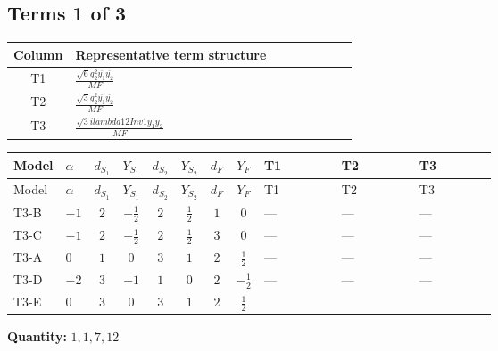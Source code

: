 \documentclass[8pt]{article}
\begin{document}
\begin{landscape}
\subsection*{Terms 1 of 3}
\begin{center}
\begin{tabular}{@{}c >{\raggedright\arraybackslash}p{0.82\linewidth}@{}}
\toprule
Column & Representative term structure \\
\midrule
T1 & \(\displaystyle \frac{\sqrt{6} g_{2}^{2} \overline{y_{1}} \overline{y_{2}}}{MF}\) \\
\midrule
T2 & \(\displaystyle \frac{\sqrt{3} g_{2}^{2} \overline{y_{1}} \overline{y_{2}}}{MF}\) \\
\midrule
T3 & \(\displaystyle \frac{\sqrt{3} i lambda12Inv1 \overline{y_{1}} \overline{y_{2}}}{MF}\) \\
\midrule
\bottomrule
\end{tabular}
\end{center}
\smallskip
\tiny
\begin{longtable}{@{}llcccccc >{\raggedright\arraybackslash}p{0.21\linewidth} >{\raggedright\arraybackslash}p{0.21\linewidth} >{\raggedright\arraybackslash}p{0.21\linewidth}@{}}
\toprule
Model & $\alpha$ & $d_{S_1}$ & $Y_{S_1}$ & $d_{S_2}$ & $Y_{S_2}$ & $d_F$ & $Y_F$ & T1 & T2 & T3 \\
\midrule
\endfirsthead
\toprule
Model & $\alpha$ & $d_{S_1}$ & $Y_{S_1}$ & $d_{S_2}$ & $Y_{S_2}$ & $d_F$ & $Y_F$ & T1 & T2 & T3 \\
\midrule
\endhead
T3-B & $-1$ & $2$ & $-\frac{1}{2}$ & $2$ & $\frac{1}{2}$ & $1$ & $0$ & --- & --- & --- \\
\midrule
T3-C & $-1$ & $2$ & $-\frac{1}{2}$ & $2$ & $\frac{1}{2}$ & $3$ & $0$ & --- & --- & --- \\
\midrule
T3-A & $0$ & $1$ & $0$ & $3$ & $1$ & $2$ & $\frac{1}{2}$ & --- & --- & --- \\
\midrule
T3-D & $-2$ & $3$ & $-1$ & $1$ & $0$ & $2$ & $-\frac{1}{2}$ & --- & --- & --- \\
\midrule
T3-E & $0$ & $3$ & $0$ & $3$ & $1$ & $2$ & $\frac{1}{2}$ & \scriptsize\adjustbox{max width=\linewidth}{$\begin{gathered} - \frac{\sqrt{6} g_{2}^{2} \overline{y_{1}} \overline{y_{2}}}{3 MF}\end{gathered}$} & \scriptsize\adjustbox{max width=\linewidth}{$\begin{gathered} - \frac{\sqrt{3} g_{2}^{2} \overline{y_{1}} \overline{y_{2}}}{6 MF}\end{gathered}$} & \scriptsize\adjustbox{max width=\linewidth}{$\begin{gathered} - \frac{\sqrt{3} i lambda12Inv1 \overline{y_{1}} \overline{y_{2}}}{6 MF}\end{gathered}$} \\
\midrule
\bottomrule
\end{longtable}
\clearpage
\noindent\textbf{Quantity: }$\mathrm{1,1,7,12}$\par\smallskip

\end{landscape}
\end{document}
